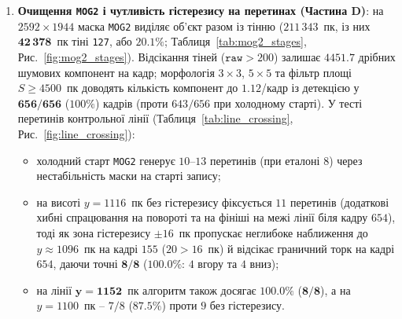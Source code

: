 \documentclass[14pt, a4paper]{extarticle}
\begin{document}
\begin{enumerate}
    \item \textbf{Очищення \texttt{MOG2} і чутливість гістерезису на перетинах (Частина D)}: на $2592 \times 1944$ маска \texttt{MOG2} виділяє об'єкт разом із тінню ($211\,343$~пк, із них $\mathbf{42\,378}$~пк тіні \texttt{127}, або $20.1\%$; Таблиця~\ref{tab:mog2_stages}, Рис.~\ref{fig:mog2_stages}). Відсікання тіней ($\texttt{raw} > 200$) залишає $4451.7$ дрібних шумових компонент на кадр; морфологія $3{\times}3$, $5{\times}5$ та фільтр площі $S \ge 4500$~пк доводять кількість компонент до $\mathbf{1.12}$/кадр із детекцією у $\mathbf{656/656}$ ($100\%$) кадрів (проти $643/656$ при холодному старті). У тесті перетинів контрольної лінії (Таблиця~\ref{tab:line_crossing}, Рис.~\ref{fig:line_crossing}):
    \begin{itemize}
        \item холодний старт \texttt{MOG2} генерує $10$--$13$ перетинів (при еталоні $8$) через нестабільність маски на старті запису;
        \item на висоті $y = 1116$~пк без гістерезису фіксується $11$ перетинів (додаткові хибні спрацювання на повороті та на фініші на межі лінії біля кадру $654$), тоді як зона гістерезису $\pm 16$~пк пропускає неглибоке наближення до $y \approx 1096$~пк на кадрі $155$ ($20 > 16$~пк) й відсікає граничний торк на кадрі $654$, даючи точні $\mathbf{8/8}$ ($\mathbf{100.0\%}$: $4$ вгору та $4$ вниз);
        \item на лінії $\mathbf{y = 1152}$~пк алгоритм також досягає $\mathbf{100.0\%}$ ($\mathbf{8/8}$), а на $y = 1100$~пк -- $7/8$ ($87.5\%$) проти $9$ без гістерезису.
    \end{itemize}


\end{enumerate}
\end{document}
